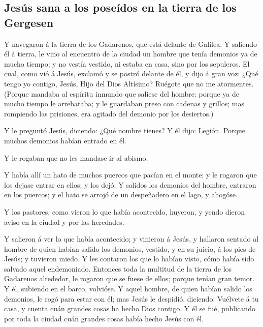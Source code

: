 \hypertarget{jesuxfas-sana-a-los-poseuxeddos-en-la-tierra-de-los-gergesen}{%
\subsection{Jesús sana a los poseídos en la tierra de los
Gergesen}\label{jesuxfas-sana-a-los-poseuxeddos-en-la-tierra-de-los-gergesen}}

 Y navegaron á la tierra de los Gadarenos, que está
delante de Galilea.  Y saliendo él á tierra, le vino al
encuentro de la ciudad un hombre que tenía demonios ya de mucho tiempo;
y no vestía vestido, ni estaba en casa, sino por los sepulcros.
 El cual, como vió á Jesús, exclamó y se postró delante
de él, y dijo á gran voz: ¿Qué tengo yo contigo, Jesús, Hijo del Dios
Altísimo? Ruégote que no me atormentes.  (Porque mandaba
al espíritu inmundo que saliese del hombre: porque ya de mucho tiempo le
arrebataba; y le guardaban preso con cadenas y grillos; mas rompiendo
las prisiones, era agitado del demonio por los desiertos.)

 Y le preguntó Jesús, diciendo: ¿Qué nombre tienes? Y él
dijo: Legión. Porque muchos demonios habían entrado en él.

 Y le rogaban que no les mandase ir al abismo.

 Y había allí un hato de muchos puercos que pacían en el
monte; y le rogaron que los dejase entrar en ellos; y los dejó.
 Y salidos los demonios del hombre, entraron en los
puercos; y el hato se arrojó de un despeñadero en el lago, y ahogóse.

 Y los pastores, como vieron lo que había acontecido,
huyeron, y yendo dieron aviso en la ciudad y por las heredades.

 Y salieron á ver lo que había acontecido; y vinieron á
Jesús, y hallaron sentado al hombre de quien habían salido los demonios,
vestido, y en su juicio, á los pies de Jesús; y tuvieron miedo.
 Y les contaron los que lo habían visto, cómo había sido
salvado aquel endemoniado.  Entonces toda la multitud de
la tierra de los Gadarenos alrededor, le rogaron que se fuese de ellos;
porque tenían gran temor. Y él, subiendo en el barco, volvióse.
 Y aquel hombre, de quien habían salido los demonios, le
rogó para estar con él; mas Jesús le despidió, diciendo: 
Vuélvete á tu casa, y cuenta cuán grandes cosas ha hecho Dios contigo. Y
él se fué, publicando por toda la ciudad cuán grandes cosas había hecho
Jesús con él.

